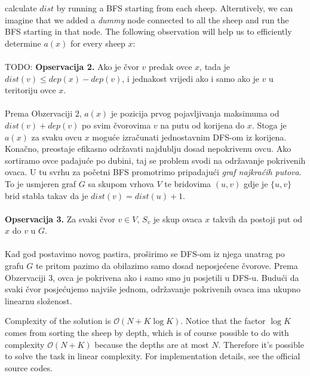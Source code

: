 calculate $dist$ by running a BFS starting from each sheep. Alterntively, we can
imagine  that we added a \textit{dummy} node connected to all the sheep and run
the BFS starting in that node. The following observation will help us to
efficiently determine $a(x)$ for every sheep $x$: \\\\
TODO:
\textbf{Opservacija 2.} Ako je čvor $v$ predak ovce $x$, tada je $dist(v) \leq
dep(x) - dep(v)$, i jednakost vrijedi ako i samo ako je $v$ u teritoriju ovce
$x$.
\\\\
Prema Obzervaciji $2$, $a(x)$ je pozicija prvog pojavljivanja maksimuma od
$dist(v) + dep(v)$ po svim čvorovima $v$ na putu od korijena do $x$. Stoga je
$a(x)$ za svaku ovcu $x$ moguće izračunati jednostavnim DFS-om iz korijena.
Konačno, preostaje efikasno održavati najdublju dosad nepokrivenu ovcu. Ako
sortiramo ovce padajuće po dubini, taj se problem svodi na održavanje
pokrivenih ovaca. U tu svrhu za početni BFS promotrimo pripadajući \textit{graf
najkraćih putova}. To je usmjeren graf $G$ sa skupom vrhova $V$ te bridovima
$(u, v)$ gdje je $\{u, v\}$ brid stabla takav da je $dist(v) = dist(u) + 1$.
\\\\
\textbf{Opservacija 3.} Za svaki čvor $v \in V$, $S_v$ je skup ovaca $x$ takvih
da postoji put od $x$ do $v$ u $G$.
\\\\
Kad god postavimo novog pastira, proširimo se DFS-om iz njega unatrag po grafu
$G$ te pritom pazimo da obilazimo samo dosad neposjećene čvorove. Prema
Obzervaciji 3, ovca je pokrivena ako i samo smo ju posjetili u DFS-u. Budući da
svaki čvor posjećujemo najviše jednom, održavanje pokrivenih ovaca ima ukupno
linearnu složenost.

Complexity of the solution is $\mathcal{O}(N + K\log K)$. Notice that the factor
$\log  K$ comes from sorting the sheep by depth, which is of course possible to
do with complexity $\mathcal{O}(N + K)$ because the depths are at most $N$.
Therefore it's possible to solve the task in linear complexity. For
implementation details, see the official source codes.

